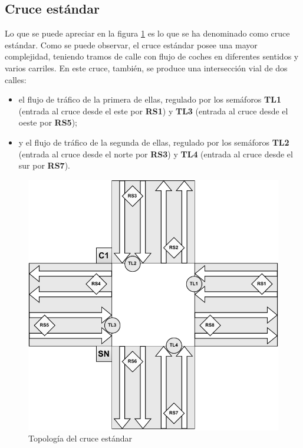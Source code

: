 \subsection{Cruce estándar}
Lo que se puede apreciar en la figura \ref{fig:cruce_estandar_topologia} es lo que se ha denominado como cruce estándar. Como se puede observar, el cruce estándar posee una mayor complejidad, teniendo tramos de calle con flujo de coches en diferentes sentidos y varios carriles. En este cruce, también, se produce una intersección vial de dos calles: 
\begin{itemize}
    \item el flujo de tráfico de la primera de ellas, regulado por los semáforos \textbf{TL1} (entrada al cruce desde el este por \textbf{RS1}) y \textbf{TL3} (entrada al cruce desde el oeste por \textbf{RS5}); 
    \item y el flujo de tráfico de la segunda de ellas, regulado por los semáforos \textbf{TL2} (entrada al cruce desde el norte por \textbf{RS3}) y \textbf{TL4} (entrada al cruce desde el sur por \textbf{RS7}).
\end{itemize}

\begin{figure}[H]
    \centering
    \includegraphics[width=1\linewidth]{text/image/DCruc-CE-Topologia.pdf}
    \caption{Topología del cruce estándar}
    \label{fig:cruce_estandar_topologia}
\end{figure}

